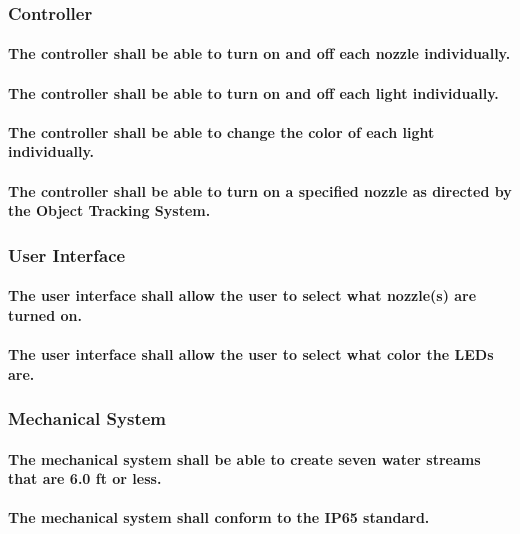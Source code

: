 \subsubsection{Controller}
\paragraph{The controller shall be able to turn on and off each nozzle individually.}
\paragraph{The controller shall be able to turn on and off each light individually.}
\paragraph{The controller shall be able to change the color of each light individually.}
\paragraph{The controller shall be able to turn on a specified nozzle as directed by the Object Tracking System.}

\subsubsection{User Interface}
\paragraph{The user interface shall allow the user to select what nozzle(s) are turned on.}
\paragraph{The user interface shall allow the user to select what color the LEDs are.}

\subsubsection{Mechanical System}
\paragraph{The mechanical system shall be able to create seven water streams that are 6.0 ft or less. }
\paragraph{The mechanical system shall conform to the IP65 standard.   }
